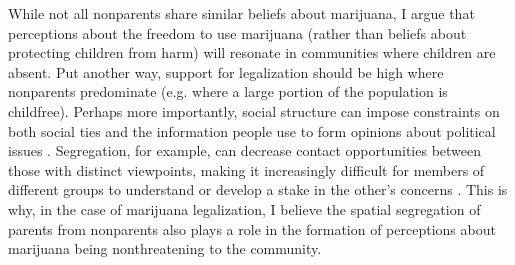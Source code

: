 While not all nonparents share similar beliefs about marijuana, I argue that perceptions about the freedom to use marijuana (rather than beliefs about protecting children from harm) will resonate in communities where children are absent. Put another way, support for legalization should be high where nonparents predominate (e.g. where a large portion of the population is childfree). Perhaps more importantly, social structure can impose constraints on both social ties and the information people use to form opinions about political issues \citep{blau_1977b,blau_1977a,mcveigh_and_sobolewski_2007}. Segregation, for example, can decrease contact opportunities between those with distinct viewpoints, making it increasingly difficult for members of different groups to understand or develop a stake in the other's concerns \citep{herek_and_capitanio_1996}. This is why, in the case of marijuana legalization, I believe the spatial segregation of parents from nonparents also plays a role in the formation of perceptions about marijuana being nonthreatening to the community. 









